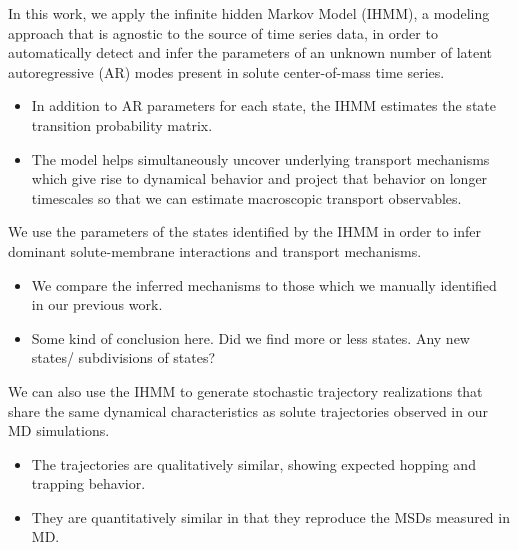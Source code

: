 \documentclass{article}
\begin{document}
  In this work, we apply the infinite hidden Markov Model (IHMM), a modeling
  approach that is agnostic to the source of time series data, in order to 
  automatically detect and infer the parameters of an unknown number of latent
  autoregressive (AR) modes present in solute center-of-mass time series.
  \begin{itemize}
  	\item In addition to AR parameters for each state, the IHMM estimates the
  	state transition probability matrix.
  	\item The model helps simultaneously uncover underlying transport mechanisms which
  	give rise to dynamical behavior and project that behavior on longer timescales so
  	that we can estimate macroscopic transport observables.
  \end{itemize}
  
  We use the parameters of the states identified by the IHMM in order to infer 
  dominant solute-membrane interactions and transport mechanisms.
  \begin{itemize}
    \item We compare the inferred mechanisms to those which we manually
    identified in our previous work. 
   \item Some kind of conclusion here. Did we find more or less states. Any new states/ subdivisions of states?
  \end{itemize}
  
  We can also use the IHMM to generate stochastic trajectory realizations that share
  the same dynamical characteristics as solute trajectories observed in our MD 
  simulations. 
  \begin{itemize}
    \item The trajectories are qualitatively similar, showing expected hopping and trapping
    behavior.
    \item They are quantitatively similar in that they reproduce the MSDs measured in MD.
  \end{itemize}
\end{document}
